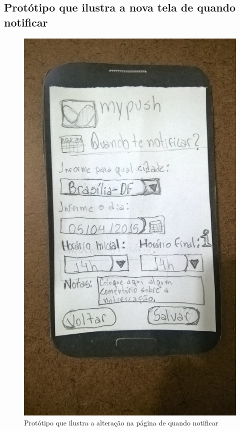 \begin{apendicesenv}
  \pagebreak
  \section*{Protótipo que ilustra a nova tela de quando notificar}

    \begin{figure}[!htbp]
      \centering
      \includegraphics[scale=0.32, angle=-90]{editaveis/figuras/prototipo_papel_v2/quando_notificar}
      \caption{Protótipo que ilustra a alteração na página de quando notificar}
      \label{quando_notificar_v2}
    \end{figure}
  

\end{apendicesenv}
